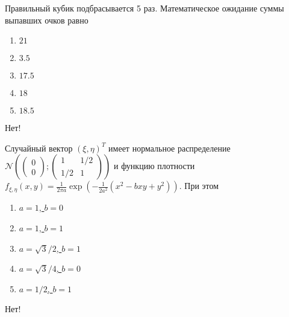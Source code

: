 \documentclass[t]{beamer}
\newcommand{\cN}{\mathcal{N}}
\begin{document}
 \begin{frame} \label{25-No} 
\begin{block}{25} 

  Правильный кубик подбрасывается 5 раз. Математическое ожидание суммы выпавших очков равно
  


 \end{block} 
\begin{enumerate} 
\item[] \hyperlink{25-No}{\beamergotobutton{} $21$}
\item[] \hyperlink{25-No}{\beamergotobutton{} $3.5$}
\item[] \hyperlink{25-Yes}{\beamergotobutton{} $17.5$}
\item[] \hyperlink{25-No}{\beamergotobutton{} $18$}
\item[] \hyperlink{25-No}{\beamergotobutton{} $18.5$}
\end{enumerate} 

 \alert{Нет!} 
\end{frame} 


 \begin{frame} \label{26-No} 
\begin{block}{26} 

  Случайный вектор $(\xi, \eta)^T$ имеет нормальное распределение
  $\cN \left(
  \begin{pmatrix}
    0 \\
    0
  \end{pmatrix};
  \begin{pmatrix}
    1 & 1/2 \\
    1/2 & 1
  \end{pmatrix}
\right)$ и функцию плотности $f_{\xi, \eta}(x, y) = \frac{1}{2\pi a} \exp\left(-\frac{1}{2a^2}(x^2-bxy+y^2) \right)$. При этом

  


 \end{block} 
\begin{enumerate} 
\item[] \hyperlink{26-No}{\beamergotobutton{} $a=1$, $b=0$}
\item[] \hyperlink{26-No}{\beamergotobutton{} $a=1$, $b=1$}
\item[] \hyperlink{26-Yes}{\beamergotobutton{} $a=\sqrt3/2$, $b=1$}
\item[] \hyperlink{26-No}{\beamergotobutton{} $a=\sqrt3/4$, $b=0$}
\item[] \hyperlink{26-No}{\beamergotobutton{} $a=1/2$, $b=1$}
\end{enumerate} 

 \alert{Нет!} 
\end{frame} 
\end{document}
